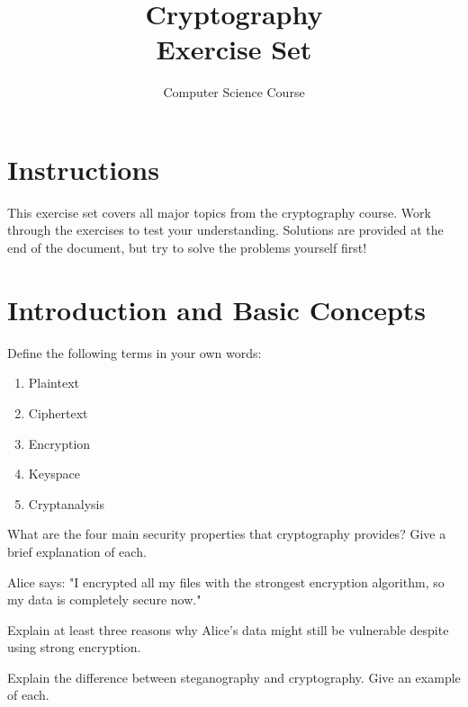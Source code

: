 \documentclass[11pt,a4paper]{report}
\title{Cryptography\\Exercise Set}
\author{Computer Science Course}
\date{}
\begin{document}
\maketitle

\section*{Instructions}
This exercise set covers all major topics from the cryptography course. Work through the exercises to test your understanding. Solutions are provided at the end of the document, but try to solve the problems yourself first!

\tableofcontents
\newpage

\section{Introduction and Basic Concepts}

\begin{ex}
Define the following terms in your own words:
\begin{enumerate}[label=\alph*)]
    \item Plaintext
    \item Ciphertext
    \item Encryption
    \item Keyspace
    \item Cryptanalysis
\end{enumerate}
\end{ex}

\begin{ex}
What are the four main security properties that cryptography provides? Give a brief explanation of each.
\end{ex}

\begin{ex}
Alice says: "I encrypted all my files with the strongest encryption algorithm, so my data is completely secure now."

Explain at least three reasons why Alice's data might still be vulnerable despite using strong encryption.
\end{ex}

\begin{ex}
Explain the difference between steganography and cryptography. Give an example of each.
\end{ex}

\end{document}

